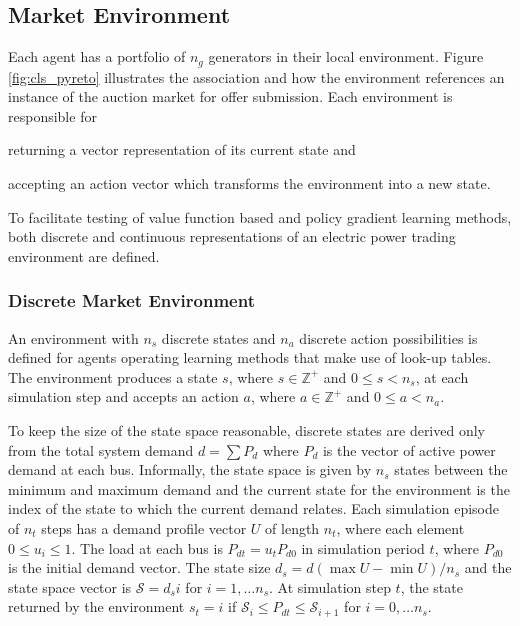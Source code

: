 \subsection{Market Environment}
Each agent has a portfolio of $n_g$ generators in their local environment.
Figure \ref{fig:cls_pyreto} illustrates the association and how the environment
references an instance of the auction market for offer submission. Each
environment is responsible for \begin{inparaenum}[(i)] \item returning a vector
representation of its current state and \item accepting an action vector which
transforms the environment into a new state. \end{inparaenum}  To facilitate
testing of value function based and policy gradient learning methods, both
discrete and continuous representations of an electric power trading environment
are defined.


\subsubsection{Discrete Market Environment}
An environment with $n_s$ discrete states and $n_a$ discrete action
possibilities is defined for agents operating learning methods that make use of
look-up tables. The environment produces a state $s$, where $s \in \mathbb{Z}^+$
and $0\leq s < n_s$, at each simulation step and accepts an action $a$, where $a
\in \mathbb{Z}^+$ and $0\leq a < n_a$.

To keep the size of the state space reasonable, discrete states are derived only
from the total system demand $d=\sum P_d$ where $P_d$ is the vector of active
power demand at each bus.  Informally, the state space is given by $n_s$ states
between the minimum and maximum demand and the current state for the environment
is the index of the state to which the current demand relates.  Each simulation
episode of $n_t$ steps has a demand profile vector $U$ of length $n_t$, where
each element $0 \leq u_i \leq 1$. The load at each bus is $P_{dt} = u_tP_{d0}$
in simulation period $t$, where $P_{d0}$ is the initial demand vector.  The
state size $d_s = d(\max U - \min U)/n_s$ and the state space vector is
$\mathscr{S}=d_si$ for $i=1,\dotsc n_s$. At simulation step $t$, the state
returned by the environment $s_t = i$ if $\mathscr{S}_i \leq P_{dt} \leq
\mathscr{S}_{i+1}$ for $i = 0,\dotsc n_s$.



